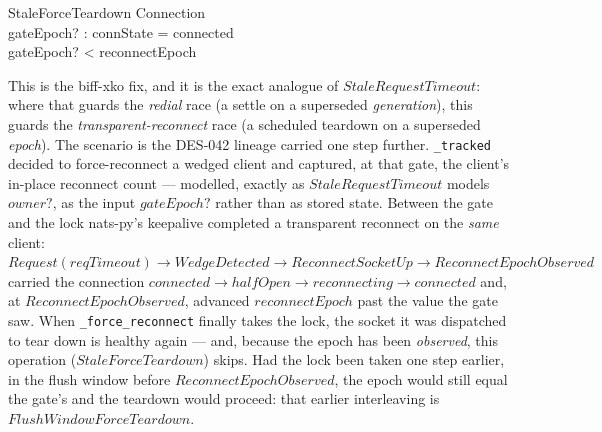 \documentclass[a4paper,10pt,fleqn]{article}
\begin{document}
\begin{schema}{StaleForceTeardown}
  \Xi Connection \\
  gateEpoch? : \nat
  \where
  connState = connected \\
  gateEpoch? < reconnectEpoch
\end{schema}

This is the biff-xko fix, and it is the exact analogue of
$StaleRequestTimeout$: where that guards the \emph{redial} race (a
settle on a superseded \emph{generation}), this guards the
\emph{transparent-reconnect} race (a scheduled teardown on a superseded
\emph{epoch}).  The scenario is the DES-042 lineage carried one step
further.  \texttt{\_tracked} decided to force-reconnect a wedged client
and captured, at that gate, the client's in-place reconnect count ---
modelled, exactly as $StaleRequestTimeout$ models $owner?$, as the input
$gateEpoch?$ rather than as stored state.  Between the gate and the lock
nats-py's keepalive completed a transparent reconnect on the \emph{same}
client: $Request(reqTimeout) \to WedgeDetected \to ReconnectSocketUp \to
ReconnectEpochObserved$ carried the connection $connected \to halfOpen
\to reconnecting \to connected$ and, at $ReconnectEpochObserved$, advanced
$reconnectEpoch$ past the value the gate saw.  When
\texttt{\_force\_reconnect} finally takes the lock, the socket it was
dispatched to tear down is healthy again --- and, because the epoch has
been \emph{observed}, this operation ($StaleForceTeardown$) skips.  Had
the lock been taken one step earlier, in the flush window before
$ReconnectEpochObserved$, the epoch would still equal the gate's and the
teardown would proceed: that earlier interleaving is
$FlushWindowForceTeardown$.
\end{document}
